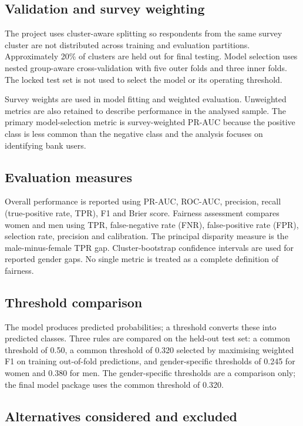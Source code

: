\documentclass[11pt,a4paper]{article}
\begin{document}
\subsection{Validation and survey weighting}

The project uses cluster-aware splitting so respondents from the same survey cluster are not distributed across training and evaluation partitions. Approximately 20\% of clusters are held out for final testing. Model selection uses nested group-aware cross-validation with five outer folds and three inner folds. The locked test set is not used to select the model or its operating threshold.

Survey weights are used in model fitting and weighted evaluation. Unweighted metrics are also retained to describe performance in the analysed sample. The primary model-selection metric is survey-weighted PR-AUC because the positive class is less common than the negative class and the analysis focuses on identifying bank users.

\subsection{Evaluation measures}

Overall performance is reported using PR-AUC, ROC-AUC, precision, recall (true-positive rate, TPR), F1 and Brier score. Fairness assessment compares women and men using TPR, false-negative rate (FNR), false-positive rate (FPR), selection rate, precision and calibration. The principal disparity measure is the male-minus-female TPR gap. Cluster-bootstrap confidence intervals are used for reported gender gaps. No single metric is treated as a complete definition of fairness.

\subsection{Threshold comparison}

The model produces predicted probabilities; a threshold converts these into predicted classes. Three rules are compared on the held-out test set: a common threshold of 0.50, a common threshold of 0.320 selected by maximising weighted F1 on training out-of-fold predictions, and gender-specific thresholds of 0.245 for women and 0.380 for men. The gender-specific thresholds are a comparison only; the final model package uses the common threshold of 0.320.

\subsection{Alternatives considered and excluded}
\end{document}
